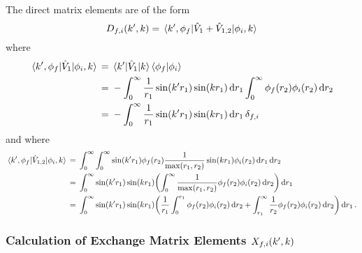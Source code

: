 \documentclass{article}
\begin{document}
The direct matrix elements are of the form
\begin{equation*}
  D_{f, i}\lr{k', k}
  =
  \mel{k', \phi_{f}}{\hat{V}_{1} + \hat{V}_{1, 2}}{\phi_{i}, k}
\end{equation*}
where
\begin{alignat*}{2}
  \mel{k', \phi_{f}}{\hat{V}_{1}}{\phi_{i}, k}
  {}={}
  &
  \mel{k'}{\hat{V}_{1}}{k}
  \braket{\phi_{f}}{\phi_{i}}
  \\
  {}={}
  &
  -
  \int_{0}^{\infty}
  {
    \dfrac{1}{r_{1}}
    \sin\lr{k' r_{1}}
    \sin\lr{k r_{1}}
  }
  \dd{r_{1}}
  \int_{0}^{\infty}
  {
    \phi_{f}\lr{r_{2}}
    \phi_{i}\lr{r_{2}}
  }
  \dd{r_{2}}
  \\
  {}={}
  &
  -
  \int_{0}^{\infty}
  {
    \dfrac{1}{r_{1}}
    \sin\lr{k' r_{1}}
    \sin\lr{k r_{1}}
  }
  \dd{r_{1}}
  \delta_{f, i}
\end{alignat*}
and where
\begin{alignat*}{2}
  \mel{k', \phi_{f}}{\hat{V}_{1, 2}}{\phi_{i}, k}
  {}={}
  &
  \int_{0}^{\infty}
  \int_{0}^{\infty}
  {
    \sin\lr{k' r_{1}}
    \phi_{f}\lr{r_{2}}
    \dfrac{1}{\max\lr{r_{1}, r_{2}}}
    \sin\lr{k r_{1}}
    \phi_{i}\lr{r_{2}}
  }
  \dd{r_{1}}
  \dd{r_{2}}
  \\
  {}={}
  &
  \int_{0}^{\infty}
  {
    \sin\lr{k' r_{1}}
    \sin\lr{k r_{1}}
    \lr[\bigg]
    {
      \int_{0}^{\infty}
      {
        \dfrac{1}{\max\lr{r_{1}, r_{2}}}
        \phi_{f}\lr{r_{2}}
        \phi_{i}\lr{r_{2}}
      }
      \dd{r_{2}}
    }
  }
  \dd{r_{1}}
  \\
  {}={}
  &
  \int_{0}^{\infty}
  {
    \sin\lr{k' r_{1}}
    \sin\lr{k r_{1}}
    \lr[\bigg]
    {
      \dfrac{1}{r_{1}}
      \int_{0}^{r_{1}}
      {
        \phi_{f}\lr{r_{2}}
        \phi_{i}\lr{r_{2}}
      }
      \dd{r_{2}}
      +
      \int_{r_{1}}^{\infty}
      {
        \dfrac{1}{r_{2}}
        \phi_{f}\lr{r_{2}}
        \phi_{i}\lr{r_{2}}
      }
      \dd{r_{2}}
    }
  }
  \dd{r_{1}}
  .
\end{alignat*}

\subsubsection{Calculation of Exchange Matrix Elements $X_{f, i}\lr{k', k}$}
\label{sec:calc-exc-me}
\end{document}
